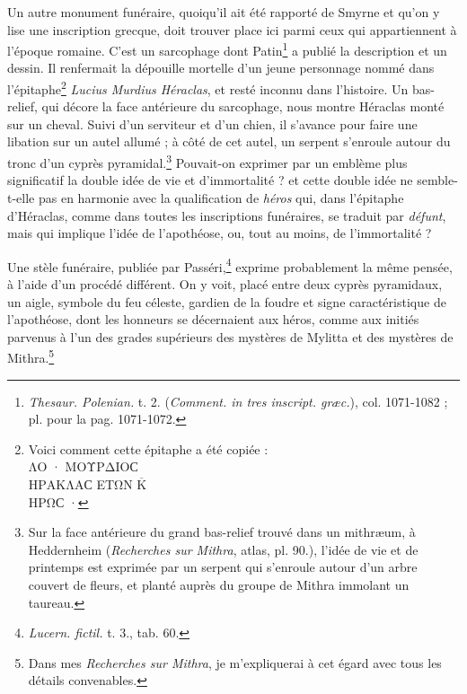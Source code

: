 \documentclass{article}
\newcommand{\textoverline}[1]{$\overline{\mbox{#1}}$}
\begin{document}
Un autre monument funéraire, quoiqu'il ait été rapporté de Smyrne et qu'on y lise une inscription grecque, doit trouver place ici parmi ceux qui appartiennent à l'époque romaine. C'est un sarcophage dont Patin\footnote{\emph{Thesaur. Polenian.} t. 2. (\emph{Comment. in tres inscript. græc.}), col. 1071-1082 ; pl. pour la pag. 1071-1072.} a publié la description et un dessin. Il renfermait la dépouille mortelle d'un jeune personnage nommé dans l'épitaphe\footnote{Voici comment cette épitaphe a été copiée :\\\hspace*{10mm}\textgreek{ΛΟ · ΜΟΥΡΔΙΟϹ\\\hspace*{10mm}ΗΡΑΚΛΑϹ ΕΤΩΝ \textoverline{Κ}\\\hspace*{10mm}ΗΡΩϹ ·}} \emph{Lucius Murdius Héraclas}, et resté inconnu dans l'histoire. Un bas-relief, qui décore la face antérieure du sarcophage, nous montre Héraclas monté sur un cheval. Suivi d'un serviteur et d'un chien, il s'avance pour faire une libation sur un autel allumé ; à côté de cet autel, un serpent s'enroule autour du tronc d'un cyprès pyramidal.\footnote{Sur la face antérieure du grand bas-relief trouvé dans un mithræum, à Heddernheim (\emph{Recherches sur Mithra}, atlas, pl. 90.), l'idée de vie et de printemps est exprimée par un serpent qui s'enroule autour d'un arbre couvert de fleurs, et planté auprès du groupe de Mithra immolant un taureau.} Pouvait-on exprimer par un emblème plus significatif la double idée de vie et d'immortalité ? et cette double idée ne semble-t-elle pas en harmonie avec la qualification de \emph{héros} qui, dans l'épitaphe d'Héraclas, comme dans toutes les inscriptions funéraires, se traduit par \emph{défunt}, mais qui implique l'idée de l'apothéose, ou, tout au moins, de l'immortalité ?

Une stèle funéraire, publiée par Passéri,\footnote{\emph{Lucern. fictil.} t. 3., tab. 60.} exprime probablement la même pensée, à l'aide d'un procédé différent. On y voit, placé entre deux cyprès pyramidaux, un aigle, symbole du feu céleste, gardien de la foudre et signe caractéristique de l'apothéose, dont les honneurs se décernaient aux héros, comme aux initiés parvenus à l'un des grades supérieurs des mystères de Mylitta et des mystères de Mithra.\footnote{Dans mes \emph{Recherches sur Mithra}, je m'expliquerai à cet égard avec tous les détails convenables.}
\end{document}
